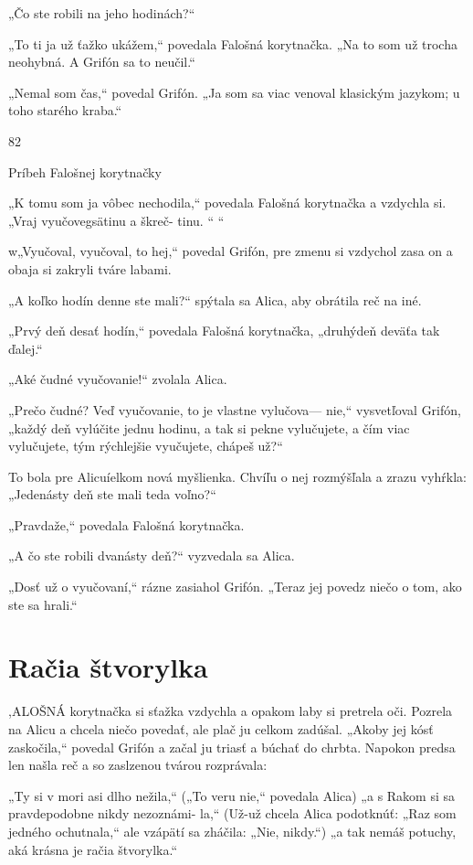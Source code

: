 \documentclass[12pt]{book}
\begin{document}
\begin{Parallel}[p]{}{}
{„Čo ste robili na jeho hodinách?“

„To ti ja už ťažko ukážem,“ povedala Falošná korytnačka.
„Na to som už trocha neohybná. A Grifón sa to neučil.“

„Nemal som čas,“ povedal Grifón. „Ja som sa viac
venoval klasickým jazykom; u toho starého kraba.“

82

Príbeh Falošnej korytnačky

„K tomu som ja vôbec nechodila,“ povedala Falošná
korytnačka a vzdychla si. „Vraj vyučovegsätinu a škreč-
tinu. “ “

w„Vyučoval, vyučoval, to hej,“ povedal Grifón, pre zmenu
si vzdychol zasa on a obaja si zakryli tváre labami.

„A koľko hodín denne ste mali?“ spýtala sa Alica, aby
obrátila reč na iné.

„Prvý deň desať hodín,“ povedala Falošná korytnačka,
„druhýdeň deväťa tak ďalej.“

„Aké čudné vyučovanie!“ zvolala Alica.

„Prečo čudné? Veď vyučovanie, to je vlastne vylučova—
nie,“ vysvetľoval Grifón, „každý deň vylúčite jednu hodinu,
a tak si pekne vylučujete, a čím viac vylučujete, tým
rýchlejšie vyučujete, chápeš už?“

To bola pre Alicuíelkom nová myšlienka. Chvíľu o nej
rozmýšľala a zrazu vyhŕkla: „Jedenásty deň ste mali teda
voľno?“

„Pravdaže,“ povedala Falošná korytnačka.

„A čo ste robili dvanásty deň?“ vyzvedala sa Alica.

„Dosť už o vyučovaní,“ rázne zasiahol Grifón. „Teraz jej
povedz niečo o tom, ako ste sa hrali.“

\section{Račia štvorylka}

,ALOŠNÁ korytnačka si sťažka vzdychla a opakom
laby si pretrela oči. Pozrela na Alicu a chcela niečo
povedať, ale plač ju celkom zadúšal. „Akoby jej kósť
zaskočila,“ povedal Grifón a začal ju triasť a búchať do
chrbta. Napokon predsa len našla reč a so zaslzenou tvárou
rozprávala:

„Ty si v mori asi dlho nežila,“ („To veru nie,“ povedala
Alica) „a s Rakom si sa pravdepodobne nikdy nezoznámi-
la,“ (Už-už chcela Alica podotknúť: „Raz som jedného
ochutnala,“ ale vzápätí sa zháčila: „Nie, nikdy.“) „a tak
nemáš potuchy, aká krásna je račia štvorylka.“

}
\end{Parallel}
\end{document}

